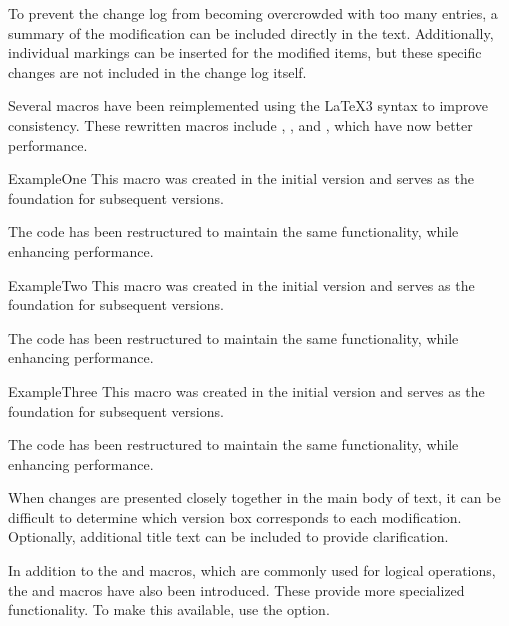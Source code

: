 \documentclass[a4paper, 11pt]{article}
\begin{document}
To prevent the change log from becoming overcrowded with too many entries, a summary of the modification can be included directly in the text. Additionally, individual markings can be inserted for the modified items, but these specific changes are not included in the change log itself.

\begin{PDExample}
    Several macros have been reimplemented using the \LaTeX 3 syntax to improve consistency. These rewritten macros include , , and , which have now better performance.

    \begin{Macro*}{ExampleOne}{}{}
        This macro was created in the initial version and serves as the foundation for subsequent versions.

        The code has been restructured to maintain the same functionality, while enhancing performance.
    \end{Macro*}

    \begin{Macro*}{ExampleTwo}{}{}
        This macro was created in the initial version and serves as the foundation for subsequent versions.

        The code has been restructured to maintain the same functionality, while enhancing performance.
    \end{Macro*}

    \begin{Macro*}{ExampleThree}{}{}
        This macro was created in the initial version and serves as the foundation for subsequent versions.

        The code has been restructured to maintain the same functionality, while enhancing performance.
    \end{Macro*}
\end{PDExample}

When changes are presented closely together in the main body of text, it can be difficult to determine which version box corresponds to each modification. Optionally, additional title text can be included to provide clarification.

\begin{PDExample}
    In addition to the  and  macros, which are commonly used for logical operations, the  and  macros have also been introduced. These provide more specialized functionality. To make this available, use the  option.
\end{PDExample}
\end{document}
